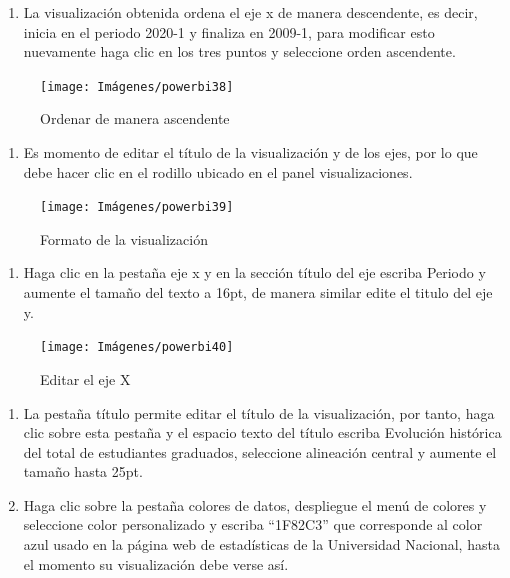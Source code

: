 \documentclass[
]{book}
\providecommand{\tightlist}{%
  \setlength{\itemsep}{0pt}\setlength{\parskip}{0pt}}
\begin{document}
\begin{enumerate}
\def\labelenumi{\arabic{enumi}.}
\setcounter{enumi}{5}
\tightlist
\item
  La visualización obtenida ordena el eje x de manera descendente, es decir, inicia en el periodo 2020-1 y finaliza en 2009-1, para modificar esto nuevamente haga clic en los tres puntos y seleccione orden ascendente.
\end{enumerate}

\begin{figure}

{\centering \texttt{[image: Imágenes/powerbi38]} 

}

\caption{Ordenar de manera ascendente}\label{fig:paso6lineaspowerbi-fig}
\end{figure}

\begin{enumerate}
\def\labelenumi{\arabic{enumi}.}
\setcounter{enumi}{6}
\tightlist
\item
  Es momento de editar el título de la visualización y de los ejes, por lo que debe hacer clic en el rodillo ubicado en el panel visualizaciones.
\end{enumerate}

\begin{figure}

{\centering \texttt{[image: Imágenes/powerbi39]} 

}

\caption{Formato de la visualización}\label{fig:paso7lineaspowerbi-fig}
\end{figure}

\begin{enumerate}
\def\labelenumi{\arabic{enumi}.}
\setcounter{enumi}{7}
\tightlist
\item
  Haga clic en la pestaña eje x y en la sección título del eje escriba Periodo y aumente el tamaño del texto a 16pt, de manera similar edite el titulo del eje y.
\end{enumerate}

\begin{figure}

{\centering \texttt{[image: Imágenes/powerbi40]} 

}

\caption{Editar el eje X}\label{fig:paso8lineaspowerbi-fig}
\end{figure}

\begin{enumerate}
\def\labelenumi{\arabic{enumi}.}
\setcounter{enumi}{8}
\item
  La pestaña título permite editar el título de la visualización, por tanto, haga clic sobre esta pestaña y el espacio texto del título escriba Evolución histórica del total de estudiantes graduados, seleccione alineación central y aumente el tamaño hasta 25pt.
\item
  Haga clic sobre la pestaña colores de datos, despliegue el menú de colores y seleccione color personalizado y escriba ``1F82C3'' que corresponde al color azul usado en la página web de estadísticas de la Universidad Nacional, hasta el momento su visualización debe verse así.
\end{enumerate}
\end{document}
